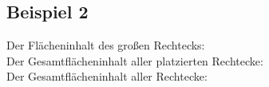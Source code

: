 \subsection{Beispiel 2}\label{ex:2}
Der Flächeninhalt des großen Rechtecks: \\
Der Gesamtflächeninhalt aller platzierten Rechtecke: \\
Der Gesamtflächeninhalt aller Rechtecke: 